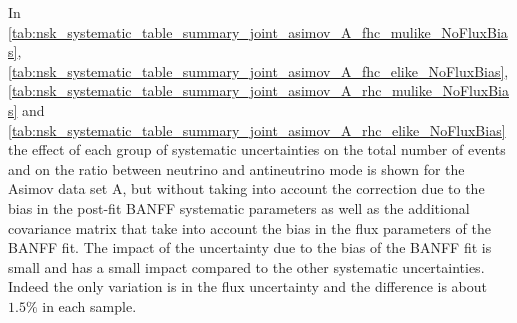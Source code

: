 \clearpage







In \cref{tab:nsk_systematic_table_summary_joint_asimov_A_fhc_mulike_NoFluxBias},
\ref{tab:nsk_systematic_table_summary_joint_asimov_A_fhc_elike_NoFluxBias},
\ref{tab:nsk_systematic_table_summary_joint_asimov_A_rhc_mulike_NoFluxBias}
and
\ref{tab:nsk_systematic_table_summary_joint_asimov_A_rhc_elike_NoFluxBias}
the effect of each group of systematic uncertainties 
on the total number of events and on the ratio 
between neutrino and antineutrino mode is shown for the Asimov data set A,
but without taking into account the correction due to the bias in the post-fit BANFF systematic
parameters as well as the additional covariance matrix that take into account
the bias in the flux parameters of the BANFF fit.
The impact of the uncertainty due to the bias of the BANFF fit is small
and has a small impact compared to the other systematic uncertainties.
Indeed the only variation is in the flux uncertainty and the difference is about $1.5\%$ in each sample.


\clearpage






